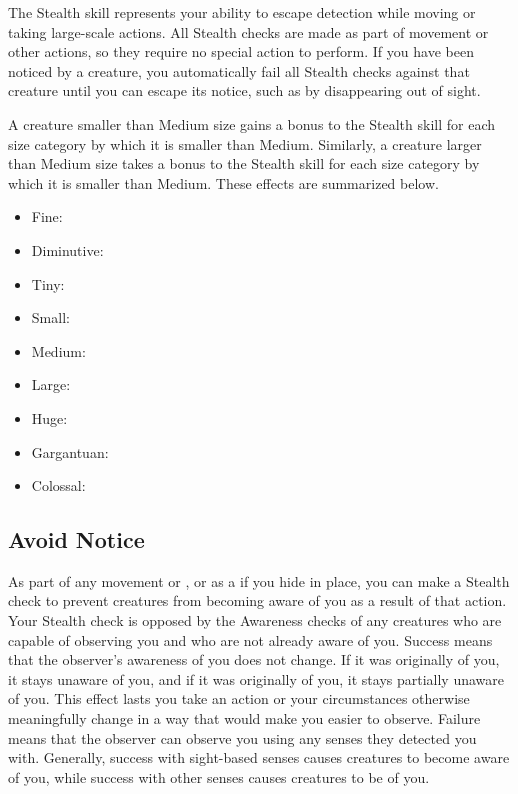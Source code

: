 \newpage
{}
        The Stealth skill represents your ability to escape detection while moving or taking large-scale actions.
        All Stealth checks are made as part of movement or other actions, so they require no special action to perform. If you have been noticed by a creature, you automatically fail all Stealth checks against that creature until you can escape its notice, such as by disappearing out of sight.

        \label{Size and Stealth} A creature smaller than Medium size gains a  bonus to the Stealth skill for each size category by which it is smaller than Medium.
        Similarly, a creature larger than Medium size takes a  bonus to the Stealth skill for each size category by which it is smaller than Medium.
        These effects are summarized below.
            \begin{itemize}
                \item Fine: 
                \item Diminutive: 
                \item Tiny: 
                \item Small: 
                \item Medium: 
                \item Large: 
                \item Huge: 
                \item Gargantuan: 
                \item Colossal: 
            \end{itemize}

    \subsection{Avoid Notice}
        As part of any movement or , or as a  if you hide in place, you can make a Stealth check to prevent creatures from becoming aware of you as a result of that action.
        Your Stealth check is opposed by the Awareness checks of any creatures who are capable of observing you and who are not already aware of you.
        Success means that the observer's awareness of you does not change.
        If it was originally \unaware of you, it stays unaware of you, and if it was originally \partiallyunaware of you, it stays partially unaware of you.
        This effect lasts you take an action or your circumstances otherwise meaningfully change in a way that would make you easier to observe.
        Failure means that the observer can observe you using any senses they detected you with.
        Generally, success with sight-based senses causes creatures to become aware of you, while success with other senses causes creatures to be \partiallyunaware of you.

